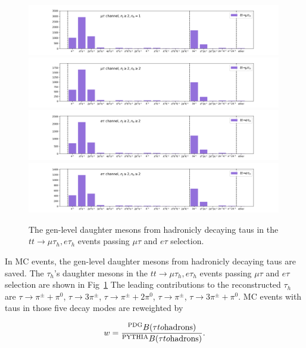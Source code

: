\begin{figure}
    \centering
    \includegraphics[width=0.99\textwidth]{chapters/Appendix/sectionTauBr/figures/tauhDecay_mutau.png}
    \includegraphics[width=0.99\textwidth]{chapters/Appendix/sectionTauBr/figures/tauhDecay_mutau2.png}
    \includegraphics[width=0.99\textwidth]{chapters/Appendix/sectionTauBr/figures/tauhDecay_etau.png}
    \includegraphics[width=0.99\textwidth]{chapters/Appendix/sectionTauBr/figures/tauhDecay_etau2.png}
    \caption{The gen-level daughter mesons from hadronicly decaying taus in the $tt\to \mu \tau_h, e \tau_h$ events passing $\mu \tau$ and $e \tau$ selection.}
    \label{fig:appendix:reweightTauhBr:tauhBr}
\end{figure}


In MC events, the gen-level daughter mesons from hadronicly decaying taus are saved. 
The $\tau_h$'s daughter mesons in the $tt\to \mu \tau_h, e \tau_h$ events 
passing $\mu \tau$ and $e \tau$ selection are shown
in Fig~\ref{fig:appendix:reweightTauhBr:tauhBr}
The leading contributions to the reconstructed $\tau_h$ are 
$\tau\to \pi^\pm+\pi^0 $, $\tau\to 3\pi^\pm$, $\tau\to \pi^\pm+2\pi^0$, $\tau\to
\pi^\pm$, $\tau\to 3\pi^\pm + \pi^0$. 
MC events with taus in those five decay modes are reweighted by 

\begin{equation}
  w = \frac{^{\rm PDG} B(\tau \to  \rm{hadrons}) }{^{\rm PYTHIA} B( \tau \to \rm{hadrons} )}. 
\end{equation} 


